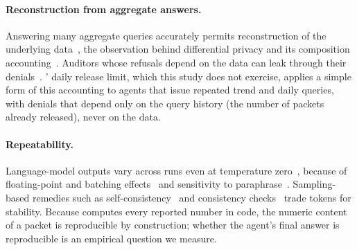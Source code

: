 \paragraph{Reconstruction from aggregate answers.} Answering many aggregate queries accurately permits
reconstruction of the underlying data~\citep{dinur2003revealing,dwork2017exposed,garfinkel2018reconstruction}, the
observation behind differential privacy and its composition
accounting~\citep{dwork2006calibrating,dwork2014algorithmic}. Auditors whose refusals depend on the data can leak
through their denials~\citep{kenthapadi2005simulatable}. \sys{}' daily release limit, which this study does not exercise, applies a simple form of this
accounting to agents that issue repeated trend and daily queries, with denials that depend only on the query
history (the number of packets already released), never on the data.

\paragraph{Repeatability.} Language-model outputs vary across runs even at temperature
zero~\citep{atil2024nondeterminism}, because of floating-point and batching effects~\citep{yuan2025nondeterminism,he2025nondeterminism}
and sensitivity to paraphrase~\citep{faghih2026samequestion}. Sampling-based remedies such as
self-consistency~\citep{wang2023selfconsistency} and consistency checks~\citep{manakul2023selfcheckgpt} trade tokens
for stability. Because \sys{} computes every reported number in code, the numeric content of a packet is
reproducible by construction; whether the agent's final answer is reproducible is an empirical question we measure.
